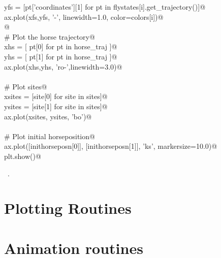 \documentclass[11.5pt]{report}
\begin{document}
\begin{flushleft}
\begin{minipage}{\linewidth}
\begin{list}{}{}
\mbox{}\verb@       yfs = [pt['coordinates'][1] for pt in flystates[i].get_trajectory()]@\\
\mbox{}\verb@       ax.plot(xfs,yfs, '-', linewidth=1.0, color=colors[i])@\\
\mbox{}\verb@  @\\
\mbox{}\verb@    # Plot the horse trajectory@\\
\mbox{}\verb@    xhs = [ pt[0] for pt in horse_traj  ]@\\
\mbox{}\verb@    yhs = [ pt[1] for pt in horse_traj  ]@\\
\mbox{}\verb@    ax.plot(xhs,yhs, 'ro-',linewidth=3.0)@\\
\mbox{}\verb@@\\
\mbox{}\verb@    # Plot sites@\\
\mbox{}\verb@    xsites = [site[0] for site in sites]@\\
\mbox{}\verb@    ysites = [site[1] for site in sites]@\\
\mbox{}\verb@    ax.plot(xsites, ysites, 'bo')@\\
\mbox{}\verb@@\\
\mbox{}\verb@    # Plot initial horseposition@\\
\mbox{}\verb@    ax.plot([inithorseposn[0]], [inithorseposn[1]], 'ks', markersize=10.0)@\\
\mbox{}\verb@    plt.show()@\\
\mbox{}\verb@@{\NWsep}
\end{list}
\vspace{-1.5ex}
\footnotesize
\begin{list}{}{\setlength{\itemsep}{-\parsep}\setlength{\itemindent}{-\leftmargin}}
\item \NWtxtMacroRefIn\ .

\item{}
\end{list}
\end{minipage}\vspace{4ex}
\end{flushleft}
\newpage
\section{Plotting Routines}
\section{Animation routines}



\needspace{17cm}
\end{document}
